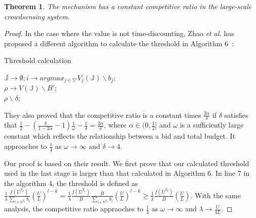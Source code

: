 \documentclass[10pt,journal,letterpaper,compsoc]{IEEEtran}
\newtheorem{theorem}{Theorem}
\newcommand{\et}{{\em et al. }}
\begin{document}
\begin{theorem}
The mechanism has a constant competitive ratio in the large-scale crowdsensing system.
\end{theorem}
\begin{proof}
In the case where the value is not time-discounting, Zhao \et has proposed a different algorithm to calculate the threshold in Algorithm 6~\cite{zhao2014crowdsource}:

\begin{algorithm}
\BlankLine
{}
\caption{Threshold calculation~\cite{zhao2014crowdsource}}
\label{alg:GetThreshold}
\begin{small}
\BlankLine
$\mathbb{J}\rightarrow\emptyset; i\rightarrow argmax_{j\in\mathbb{S}'}V_j(\mathbb{J})\backslash b_j$;\\

$\rho\rightarrow V(\mathbb{J})\backslash B'$;\\
\Return $\rho\backslash \delta;$
\end{small}
\end{algorithm}
They also proved that the competitive ratio is a constant times $\frac{2\alpha}{\delta}$ if $\delta$ satisfies that $\frac{1}{2}-(\frac{\delta}{1-2\alpha}-1)\frac{1}{\omega}-\frac{1}{\delta}=\frac{2\alpha}{\delta}$, where $\alpha\in(0,\frac{1}{2}]$ and $\omega$ is a sufficiently large constant which reflects the relationship between a bid and total budget. It approaches to $\frac{1}{4}$ as $\omega\to\infty$ and $\delta\to4$.

Our proof is based on their result. We first prove that our calculated threshold used in the last stage is larger than that calculated in Algorithm 6. In line 7 in the algorithm 4, the threshold is defined as $\frac{1}{\lambda}\frac{f(\mathbb{D}^{T_k})}{\sum_{i\in\mathbb{D}^{T_k}}b_i}\left(\frac{U}{L}\right)^{l-k}=\frac{1}{\lambda}\frac{f(\mathbb{D}^{T_k})}{B}\frac{B}{\sum_{i\in\mathbb{D}^{T_k}}b_i}\left(\frac{U}{L}\right)^{l-k}\ge\frac{1}{\lambda}\frac{f(\mathbb{D}^{T_k})}{B}\left(\frac{U}{L}\right)$. With the same analysis, the competitive ratio appraoches to $\frac{1}{4}$ as $\omega\to\infty$ and $\lambda\to\frac{U}{4L}$.
\end{proof}
\end{document}
